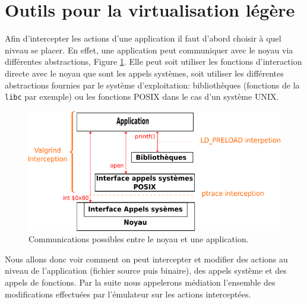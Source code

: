 \section{Outils pour la virtualisation légère}
\label{section:tools}

Afin d'intercepter les actions d'une application il faut d'abord choisir à quel
niveau se placer.  En effet, une application peut communiquer avec le noyau via
différentes abstractions, Figure \ref{AS_Communication}. Elle peut soit utiliser
les fonctions d'interaction directe avec le noyau que sont les appels systèmes,
soit utiliser les différentes abstractions fournies par le système
d'exploitation: bibliothèques (fonctions de la \texttt{libc} par exemple) ou les
fonctions POSIX dans le cas d'un système UNIX.

\begin{figure}[H]
 \centering
 \includegraphics[scale=0.75]{Pictures/png/Communication_application_noyau_v3.png}
 \caption{Communications possibles entre le noyau et une application.}
 \label{AS_Communication}
\end{figure}

Nous allons donc voir comment on peut intercepter et modifier des actions au
niveau de l'application (fichier source puis binaire), des appels système et
des appels de fonctions. Par la suite nous appelerons médiation l'ensemble des
modifications effectuées par l'émulateur sur les actions interceptées.

